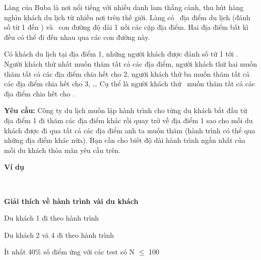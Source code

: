 Làng của Buba là nơi nổi tiếng với nhiều danh lam thắng cảnh, thu hút hàng nghìn khách du lịch từ nhiều nơi trên thế giới. Làng có  địa điểm du lịch (đánh số từ 1 đến ) và  con đường độ dài 1 nối các cặp địa điểm. Hai địa điểm bất kì đều có thể đi đến nhau qua các con đường này.

Có khách du lịch tại địa điểm 1, những người khách được đánh số từ 1 tới . Người khách thứ nhất muốn thăm tất cả các địa điểm, người khách thứ hai muốn thăm tất cả các địa điểm chia hết cho 2, người khách thứ ba muốn thăm tất cả các địa điểm chia hết cho 3, … Cụ thể là người khách thứ  muốn thăm tất cả các địa điểm chia hết cho .

\textbf{Yêu cầu: } Công ty du lịch muốn lập hành trình cho từng du khách bắt đầu từ địa điểm 1 đi thăm các địa điểm khác rồi quay trở về địa điểm 1 sao cho mỗi du khách được đi qua tất cả các địa điểm anh ta muốn thăm (hành trình có thể qua những địa điểm khác nữa). Bạn cần cho biết độ dài hành trình ngắn nhất của mỗi du khách thỏa mãn yêu cầu trên.

\textbf{Ví dụ }

 

\textbf{Giải thích về hành trình vài du khách }

Du khách 1 đi theo hành trình \textbf{}

Du khách 2 và 4 đi theo hành trình

Ít nhất 40\% số điểm ứng với các test có N  $\le$  100